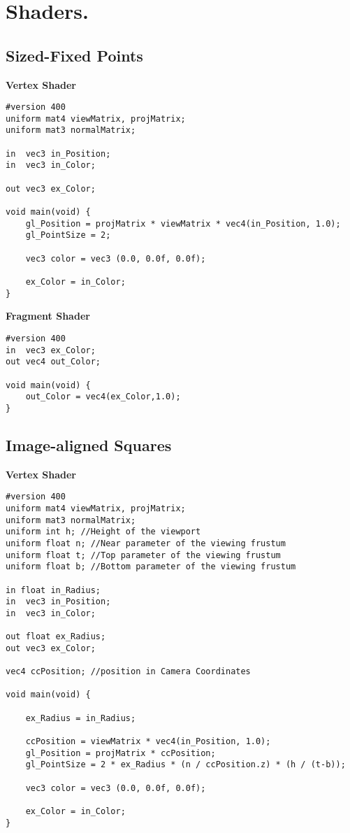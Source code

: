 %
%

\chapter[Shaders]{Shaders.}

\section{Sized-Fixed Points \label{sized-fixed}}

\textbf{Vertex Shader}
\begin{lstlisting}[frame=single]
#version 400
uniform mat4 viewMatrix, projMatrix;
uniform mat3 normalMatrix;

in  vec3 in_Position;
in  vec3 in_Color;

out vec3 ex_Color;

void main(void) {
	gl_Position = projMatrix * viewMatrix * vec4(in_Position, 1.0);
	gl_PointSize = 2;

	vec3 color = vec3 (0.0, 0.0f, 0.0f);

	ex_Color = in_Color;
}
\end{lstlisting}

\textbf{Fragment Shader}
\begin{lstlisting}[frame=single]
#version 400
in  vec3 ex_Color;
out vec4 out_Color;

void main(void) {	
	out_Color = vec4(ex_Color,1.0);
}
\end{lstlisting}
\vfill

\section{Image-aligned Squares \label{image-aligned}}
\textbf{Vertex Shader}
\begin{lstlisting}[frame=single]
#version 400
uniform mat4 viewMatrix, projMatrix;
uniform mat3 normalMatrix;
uniform int h; //Height of the viewport
uniform float n; //Near parameter of the viewing frustum
uniform float t; //Top parameter of the viewing frustum
uniform float b; //Bottom parameter of the viewing frustum

in float in_Radius;
in  vec3 in_Position;
in  vec3 in_Color;

out float ex_Radius;
out vec3 ex_Color;

vec4 ccPosition; //position in Camera Coordinates

void main(void) {

	ex_Radius = in_Radius;

	ccPosition = viewMatrix * vec4(in_Position, 1.0);
	gl_Position = projMatrix * ccPosition;
	gl_PointSize = 2 * ex_Radius * (n / ccPosition.z) * (h / (t-b));

	vec3 color = vec3 (0.0, 0.0f, 0.0f);

	ex_Color = in_Color;
}
\end{lstlisting}

